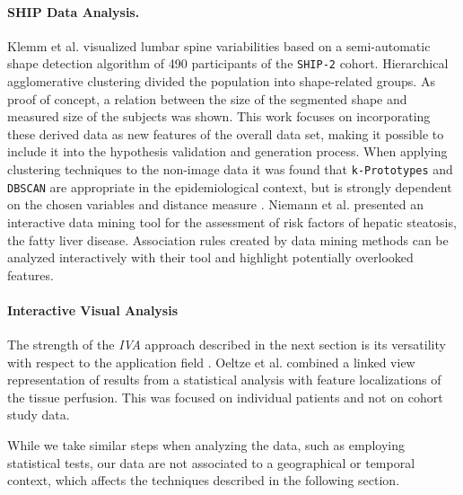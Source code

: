 \documentclass[journal]{style/vgtc} 			          %
\begin{document}
\paragraph{SHIP Data Analysis.}
Klemm et al. \cite{Klemm2013VMV} visualized lumbar spine variabilities based on a semi-automatic shape detection algorithm of 490 participants of the \texttt{SHIP-2} cohort.
%
Hierarchical agglomerative clustering divided the population into shape-related groups.
%
As proof of concept, a relation between the size of the segmented shape and measured size of the subjects was shown.
%
This work focuses on incorporating these derived data as new features of the overall data set, making it possible to include it into the hypothesis validation and generation process.
%
When applying clustering techniques to the non-image data it was found that \texttt{k-Prototypes} and \texttt{DBSCAN} are appropriate in the epidemiological context, but is strongly dependent on the chosen variables and distance measure \cite{Klemm2014BVM}.
%
Niemann et al. \cite{Niemann2014} presented an interactive data mining tool for the assessment of risk factors of hepatic steatosis, the fatty liver disease.
%
Association rules created by data mining methods can be analyzed interactively with their tool and highlight potentially overlooked features.

\paragraph{Interactive Visual Analysis}
The strength of the \emph{IVA} approach described in the next section is its versatility with respect to the application field \cite{Konyha2009}.
%
Oeltze et al. \cite{Oeltze2007} combined a linked view representation of results from a statistical analysis with feature localizations of the tissue perfusion. %
%
This was focused on individual patients and not on cohort study data. 
%

While we take similar steps when analyzing the data, such as employing statistical tests, our data are not associated to a geographical or temporal context, which affects the techniques described in the following section.
\end{document}
